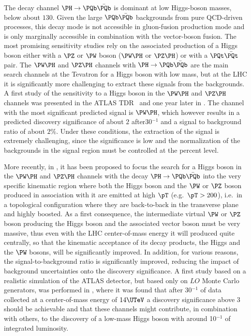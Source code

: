 The decay channel $\PH \rightarrow \PQb\bar{\PQb}$ is dominant at low
Higgs-boson masses, below about $130$\UGeV. Given the large $\PQb\bar{\PQb}$ 
backgrounds from pure QCD-driven processes, this decay mode is not accessible 
in gluon-fusion production mode and is only marginally accessible 
in combination with the vector-boson fusion. The most promising 
sensitivity studies rely on the associated production of a Higgs boson either with a
$\PZ$ or $\PW$ boson ($\PW\PH$ or $\PZ\PH$) or with a $\PQt\bar{\PQt}$
pair. The $\PW\PH$ and $\PZ\PH$ channels with $\PH \to \PQb\bar{\PQb}$
are the main search channels at the Tevatron for a Higgs boson with low
mass, but at the LHC it is significantly more challenging to extract
these signals from the backgrounds. A first study of the sensitivity to
a Higgs boson in the $\PW\PH$ and $\PZ\PH$ channels was presented in the
ATLAS TDR~\cite{atlasphystdr} and one year later in
. The channel with the
most significant predicted signal is $\PW\PH$, which however results in
a predicted discovery significance of about $2$ after30\Ufb$^{-1}$ and a signal to background ratio of about $2$\%. Under these conditions, the extraction of the signal is extremely
challenging, since the significance is low and the normalization of the
backgrounds in the signal region must be controlled at the percent level.

More recently, in , it has been proposed
to focus the search for a Higgs boson in the $\PW\PH$ and $\PZ\PH$
channels with the decay $\PH \rightarrow \PQb\bar{\PQb}$ into the very
specific kinematic region where both the Higgs boson and the $\PW$ or
$\PZ$ boson produced in association with it are emitted at high $\pT$
(e.g.\ $\pT>200$\UGeV), i.e.\ in a topological configuration where they
are back-to-back in the transverse plane and highly boosted. As a first
consequence, the intermediate virtual $\PW$ or $\PZ$ boson producing the
Higgs boson and the associated vector boson must be very massive, thus
even with the LHC center-of-mass energy it will produced quite
centrally, so that the kinematic acceptance of its decay products, the
Higgs and the $\PW$ bosons, will be significantly improved. In addition,
for various reasons, the signal-to-background ratio is significantly
improved, reducing the impact of background uncertainties onto the
discovery significance. A first study based on a realistic simulation of
the ATLAS detector, but based only on $LO$ Monte Carlo generators, was
performed in , where it was found that
after 30\Ufb$^{-1}$ of data collected at a center-of-mass energy of
$14\UTeV$ a discovery significance above $3$ should be achievable and that
these channels might contribute, in combination with others, to the
discovery of a low-mass Higgs boson with around 10\Ufb$^{-1}$ of
integrated luminosity.

